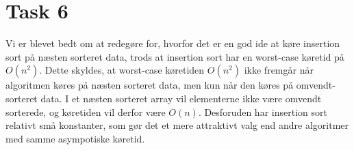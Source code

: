 \section{Task 6}

Vi er blevet bedt om at redegøre for, hvorfor det er en god ide
at køre insertion sort på næsten sorteret data, trods
at insertion sort har en worst-case køretid på $O(n^2)$.
Dette skyldes, at worst-case køretiden $O(n^2)$ ikke fremgår når algoritmen køres på næsten sorteret data, men kun når den køres på omvendt-sorteret data.
I et næsten sorteret array vil elementerne ikke være omvendt sorterede,
og køretiden vil derfor være $O(n)$. Desforuden har insertion sort relativt små konstanter, som gør det et mere attraktivt valg end andre algoritmer med samme asympotiske køretid. 
